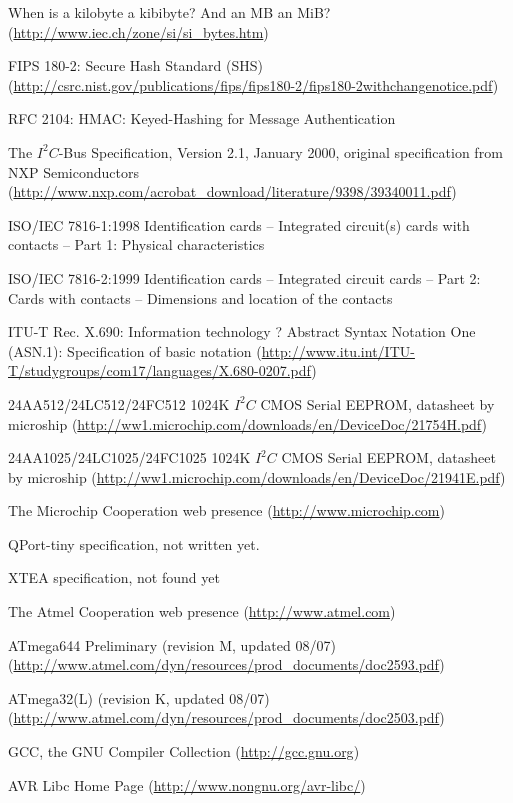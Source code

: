 \documentclass[10pt,a4paper]{article}
\begin{document}
\begin{thebibliography}{999}
 When is a kilobyte a kibibyte? And an MB an MiB? (\url{http://www.iec.ch/zone/si/si_bytes.htm})

 FIPS 180-2: Secure Hash Standard (SHS) (\url{http://csrc.nist.gov/publications/fips/fips180-2/fips180-2withchangenotice.pdf})
 
 RFC 2104: HMAC: Keyed-Hashing for Message Authentication

 The $I^2C$-Bus Specification, Version 2.1, January 2000, original specification from NXP Semiconductors (\url{http://www.nxp.com/acrobat_download/literature/9398/39340011.pdf})
 
 ISO/IEC 7816-1:1998 Identification cards -- Integrated circuit(s) cards with contacts -- Part 1: Physical characteristics

 ISO/IEC 7816-2:1999 Identification cards -- Integrated circuit cards -- Part 2: Cards with contacts -- Dimensions and location of the contacts

 ITU-T Rec. X.690: Information technology ? Abstract Syntax Notation One (ASN.1): Specification of basic notation (\url{http://www.itu.int/ITU-T/studygroups/com17/languages/X.680-0207.pdf})

  24AA512/24LC512/24FC512 1024K $I^2C$ CMOS Serial EEPROM, datasheet by microship (\url{http://ww1.microchip.com/downloads/en/DeviceDoc/21754H.pdf})

  24AA1025/24LC1025/24FC1025 1024K $I^2C$ CMOS Serial EEPROM, datasheet by microship (\url{http://ww1.microchip.com/downloads/en/DeviceDoc/21941E.pdf})

 The Microchip Cooperation web presence (\url{http://www.microchip.com})

  QPort-tiny specification, not written yet.

  XTEA specification, not found yet 

 The Atmel Cooperation web presence (\url{http://www.atmel.com})  

 ATmega644 Preliminary (revision M, updated 08/07)  (\url{http://www.atmel.com/dyn/resources/prod_documents/doc2593.pdf})

 ATmega32(L) (revision K, updated 08/07)  (\url{http://www.atmel.com/dyn/resources/prod_documents/doc2503.pdf})

 GCC, the GNU Compiler Collection (\url{http://gcc.gnu.org})
 
 AVR Libc Home Page (\url{http://www.nongnu.org/avr-libc/})
\end{thebibliography}
\end{document}
